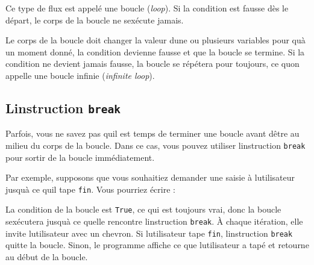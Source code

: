 Ce type de flux est appelé une boucle (\emph{loop}). Si la condition est
fausse dès le départ, le corps de la boucle ne s\textquotesingle exécute
jamais.

Le corps de la boucle doit changer la valeur d\textquotesingle une ou
plusieurs variables pour qu\textquotesingle à un moment donné, la
condition devienne fausse et que la boucle se termine. Si la condition
ne devient jamais fausse, la boucle se répétera pour toujours, ce
qu\textquotesingle on appelle une boucle infinie (\emph{infinite loop}).

\hypertarget{linstruction-break}{%
\subsection{\texorpdfstring{L\textquotesingle instruction
\texttt{break}}{L\textquotesingle instruction break}}\label{linstruction-break}}

Parfois, vous ne savez pas qu\textquotesingle il est temps de terminer
une boucle avant d\textquotesingle être au milieu du corps de la boucle.
Dans ce cas, vous pouvez utiliser l\textquotesingle instruction
\texttt{break} pour sortir de la boucle immédiatement.

Par exemple, supposons que vous souhaitiez demander une saisie à
l\textquotesingle utilisateur jusqu\textquotesingle à ce
qu\textquotesingle il tape
\texttt{\textquotesingle{}fin\textquotesingle{}}. Vous pourriez écrire :

\begin{Shaded}
\begin{Highlighting}[]
 \NormalTok{:}
\OperatorTok{=} \NormalTok{(}\StringTok{\textquotesingle{}\textgreater{} \textquotesingle{}}\NormalTok{)}
    \OperatorTok{==} \NormalTok{:}
\NormalTok{(}\NormalTok{)}
\end{Highlighting}
\end{Shaded}

La condition de la boucle est \texttt{True}, ce qui est toujours vrai,
donc la boucle s\textquotesingle exécutera jusqu\textquotesingle à ce
qu\textquotesingle elle rencontre l\textquotesingle instruction
\texttt{break}. À chaque itération, elle invite
l\textquotesingle utilisateur avec un chevron. Si
l\textquotesingle utilisateur tape \texttt{fin},
l\textquotesingle instruction \texttt{break} quitte la boucle. Sinon, le
programme affiche ce que l\textquotesingle utilisateur a tapé et
retourne au début de la boucle.

